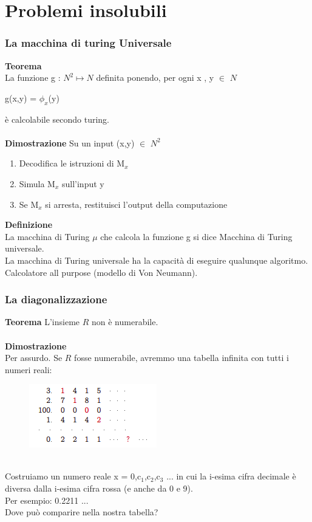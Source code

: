 \chapter{Problemi insolubili} \label{ch:capitolo4}
\subsection{La macchina di turing Universale}
\textbf{Teorema}\\
La funzione g : $N^2 \mapsto N$ definita ponendo, per ogni x , y $\in$ $N$
\begin{center}
    g(x,y) = $\phi_x$(y)
\end{center}
è calcolabile secondo turing.\\\\
\textbf{Dimostrazione}
Su un input (x,y) $\in$ $N^2$
\begin{enumerate}
    \item Decodifica le istruzioni di M$_x$
    
    \item Simula M$_x$ sull’input y
    
    \item Se M$_x$ si arresta, restituisci l’output della computazione
\end{enumerate}
\textbf{Definizione}\\
La macchina di Turing $\mu$ che calcola la funzione g si dice Macchina di Turing universale.\\
La macchina di Turing universale ha la capacità di eseguire qualunque algoritmo.\\
Calcolatore all purpose (modello di Von Neumann).
\newpage
\subsection{La diagonalizzazione}
\textbf{Teorema}
L'insieme $R$ non è numerabile.\\\\
\textbf{Dimostrazione}\\
Per assurdo. Se $R$ fosse numerabile, avremmo una tabella infinita con tutti i numeri reali:\\
\begin{figure}[htp]
    \centering
    \includegraphics[scale=0.8]{tesi_stile/img/diagonalizzazione.png}
\end{figure}\\
Costruiamo un numero reale x = 0,c$_1$,c$_2$,c$_3$ ... in cui la i-esima cifra decimale è diversa dalla i-esima cifra rossa (e anche da 0 e 9).\\
Per esempio: 0.2211 ...\\
Dove può comparire nella nostra tabella?
\newpage
